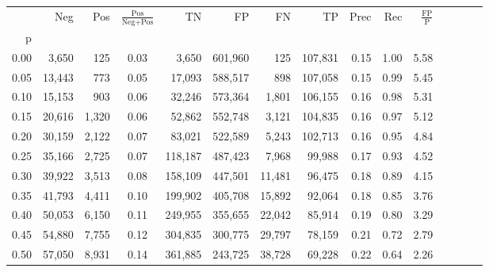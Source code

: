 \begin{tabular}{rrrcrrrrrrrrrrr}
\toprule
{} &     Neg &     Pos & $\frac{\text{Pos}}{\text{Neg}+\text{Pos}}$ &       TN &       FP &       FN &       TP &  Prec &   Rec & $\frac{\text{FP}}{\text{P}}$ \\
p    &         &         &                                            &          &          &          &          &       &       &                              \\
\midrule
0.00 &   3,650 &     125 &                                       0.03 &    3,650 &  601,960 &      125 &  107,831 &  0.15 &  1.00 &                         5.58 \\
0.05 &  13,443 &     773 &                                       0.05 &   17,093 &  588,517 &      898 &  107,058 &  0.15 &  0.99 &                         5.45 \\
0.10 &  15,153 &     903 &                                       0.06 &   32,246 &  573,364 &    1,801 &  106,155 &  0.16 &  0.98 &                         5.31 \\
0.15 &  20,616 &   1,320 &                                       0.06 &   52,862 &  552,748 &    3,121 &  104,835 &  0.16 &  0.97 &                         5.12 \\
0.20 &  30,159 &   2,122 &                                       0.07 &   83,021 &  522,589 &    5,243 &  102,713 &  0.16 &  0.95 &                         4.84 \\
0.25 &  35,166 &   2,725 &                                       0.07 &  118,187 &  487,423 &    7,968 &   99,988 &  0.17 &  0.93 &                         4.52 \\
0.30 &  39,922 &   3,513 &                                       0.08 &  158,109 &  447,501 &   11,481 &   96,475 &  0.18 &  0.89 &                         4.15 \\
0.35 &  41,793 &   4,411 &                                       0.10 &  199,902 &  405,708 &   15,892 &   92,064 &  0.18 &  0.85 &                         3.76 \\
0.40 &  50,053 &   6,150 &                                       0.11 &  249,955 &  355,655 &   22,042 &   85,914 &  0.19 &  0.80 &                         3.29 \\
0.45 &  54,880 &   7,755 &                                       0.12 &  304,835 &  300,775 &   29,797 &   78,159 &  0.21 &  0.72 &                         2.79 \\
0.50 &  57,050 &   8,931 &                                       0.14 &  361,885 &  243,725 &   38,728 &   69,228 &  0.22 &  0.64 &                         2.26 \\

\end{tabular}
